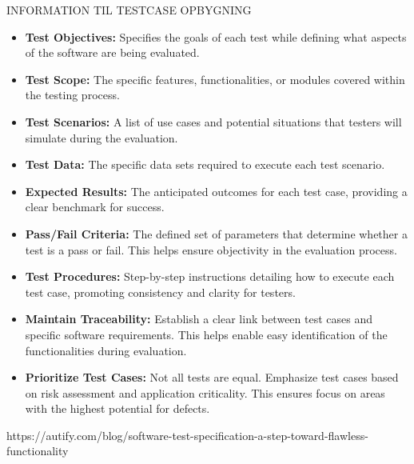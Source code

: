 INFORMATION TIL TESTCASE OPBYGNING
\begin{itemize}
    \item \textbf{Test Objectives: }Specifies the goals of each test while defining what aspects of the software are being evaluated.
    \item \textbf{Test Scope:} The specific features, functionalities, or modules covered within the testing process.
    \item \textbf{Test Scenarios:} A list of use cases and potential situations that testers will simulate during the evaluation.
    \item \textbf{Test Data:} The specific data sets required to execute each test scenario.
    \item \textbf{Expected Results:} The anticipated outcomes for each test case, providing a clear benchmark for success.
    \item \textbf{Pass/Fail Criteria:} The defined set of parameters that determine whether a test is a pass or fail. This helps ensure objectivity in the evaluation process.
    \item \textbf{Test Procedures:} Step-by-step instructions detailing how to execute each test case, promoting consistency and clarity for testers.
\end{itemize}


\begin{itemize}
    \item \textbf{Maintain Traceability:} Establish a clear link between test cases and specific software requirements. This helps enable easy identification of the functionalities during evaluation.
    \item \textbf{Prioritize Test Cases:} Not all tests are equal. Emphasize test cases based on risk assessment and application criticality. This ensures focus on areas with the highest potential for defects.
\end{itemize}

https://autify.com/blog/software-test-specification-a-step-toward-flawless-functionality
